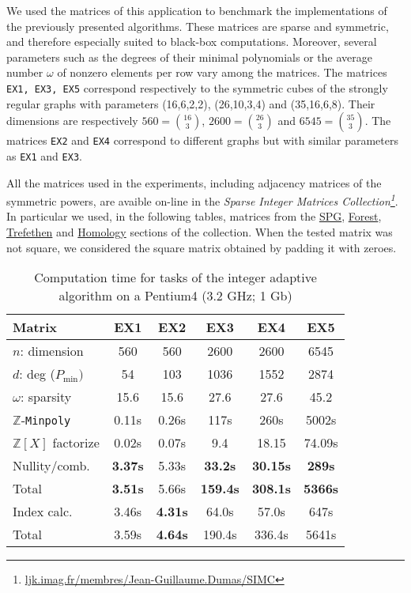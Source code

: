 \documentclass{article}
\newcommand{\Z}{\mathbb{Z}}
\begin{document}
We used the matrices of this application to benchmark the implementations of the
previously presented algorithms.
These matrices are sparse and symmetric, and therefore especially suited to black-box
computations.
Moreover, several parameters such as the degrees of their
minimal polynomials or the average number $\omega$ of nonzero elements per row
vary among the matrices. The matrices \texttt{EX1, EX3, EX5} correspond
respectively to the symmetric cubes of the strongly regular graphs with
parameters (16,6,2,2), (26,10,3,4) and (35,16,6,8). Their dimensions are
respectively
$560 = \binom{16}{3}$, $2600 =
\binom{26}{3}$ and $6545 = \binom{35}{3}$.
The matrices \texttt{EX2} and \texttt{EX4} correspond to different graphs but
with similar parameters as \texttt{EX1} and \texttt{EX3}.

All the matrices used in the experiments, including adjacency matrices
of the symmetric powers, are avaible on-line in the {\em Sparse Integer
Matrices
Collection\footnote{\url{ljk.imag.fr/membres/Jean-Guillaume.Dumas/SIMC}}}.
In particular we used, in the following tables, matrices from the
\url{SPG}, \url{Forest}, \url{Trefethen} and  \url{Homology} sections of the
collection. When the tested matrix was not square, we considered the
square matrix obtained by padding it with zeroes.

\begin{table}[hptb]
\begin{center}
{\small
\begin{tabular}{lccccc}
\toprule
Matrix           &  EX1 & EX2 & EX3 & EX4 & EX5 \\ 
\midrule
$n$: dimension   & 560  & 560 & 2600 & 2600 & 6545 \\
$d$: deg ($P_\text{min})$ & 54  & 103 & 1036 & 1552 & 2874  \\
$\omega$: sparsity & 15.6 & 15.6 & 27.6 & 27.6 & 45.2\\
\midrule
$\Z$-\texttt{Minpoly} & 0.11s & 0.26s & 117s & 260s & 5002s  \\
\midrule
$\Z[X]$ factorize& 0.02s & 0.07s & 9.4 & 18.15 & 74.09s \\
\midrule
Nullity/comb.& \textbf{3.37s} & 5.33s & \textbf{33.2s} & \textbf{30.15s} &\textbf{289s} \\
Total& \textbf{3.51s} & 5.66s & \textbf{159.4s} & \textbf{308.1s} & \textbf{5366s}\\
\midrule
Index calc.  & 3.46s & \textbf{4.31s} & 64.0s & 57.0s & 647s\\
Total&  3.59s & \textbf{4.64s} & 190.4s & 336.4s & 5641s\\
\bottomrule
\end{tabular}
}
\end{center}
\caption{Computation time for tasks of the integer adaptive algorithm on a
  Pentium4 (3.2 GHz; 1 Gb)}\label{table:timings} 

\end{table}
\end{document}
